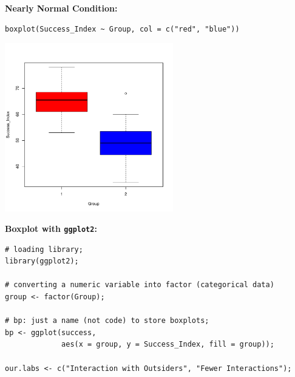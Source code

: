 \begin{example}
\begin{minipage}{\textwidth}
\label{fig:qqplot-group2}
\end{minipage}

\vspace{1.00em}

\noindent\textbf{Nearly Normal Condition:}
\begin{tcolorbox}[colback=gray!10, colframe=black!45, arc=2mm,
  before skip=4pt, after skip=4pt]
\begin{verbatim}
boxplot(Success_Index ~ Group, col = c("red", "blue"))
\end{verbatim}
\end{tcolorbox}
\noindent
\begin{minipage}{\textwidth}
\centering
\includegraphics[width=0.55\textwidth]{section14.1/images/boxplot_success_index.pdf}
\vspace{-0.5em}

\label{fig:boxplot-success}
\end{minipage}
\vspace{-1,00em}

\noindent\textbf{Boxplot with \texttt{ggplot2}:}
\begin{tcolorbox}[colback=gray!10, colframe=black!45, arc=2mm,
  before skip=4pt, after skip=4pt]
\begin{verbatim}
# loading library;
library(ggplot2);

# converting a numeric variable into factor (categorical data)
group <- factor(Group);

# bp: just a name (not code) to store boxplots;
bp <- ggplot(success,
             aes(x = group, y = Success_Index, fill = group));

our.labs <- c("Interaction with Outsiders", "Fewer Interactions");


\end{verbatim}
\end{tcolorbox}
\end{example}
